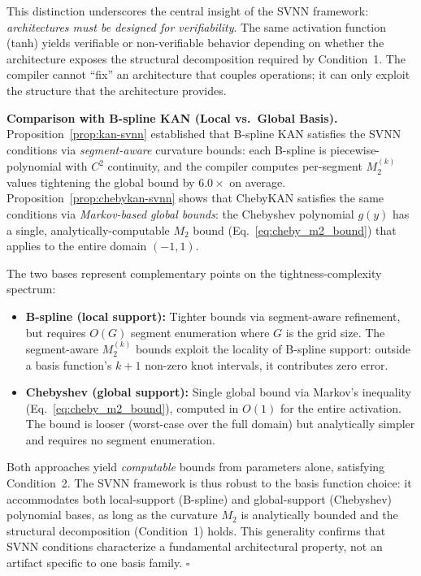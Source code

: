 This distinction underscores the central insight of the SVNN framework:
\textit{architectures must be designed for verifiability}. The same
activation function (tanh) yields verifiable or non-verifiable behavior
depending on whether the architecture exposes the structural decomposition
required by Condition~1. The compiler cannot ``fix'' an architecture that
couples operations; it can only exploit the structure that the architecture
provides.

\vspace{2pt}
\noindent\textbf{Comparison with B-spline KAN (Local vs.\ Global Basis).}
Proposition~\ref{prop:kan-svnn} established that B-spline KAN satisfies the
SVNN conditions via \textit{segment-aware} curvature bounds: each B-spline
is piecewise-polynomial with $C^2$ continuity, and the compiler computes
per-segment $M_2^{(k)}$ values tightening the global bound by $6.0\times$
on average. Proposition~\ref{prop:chebykan-svnn} shows that ChebyKAN
satisfies the same conditions via \textit{Markov-based global bounds}: the
Chebyshev polynomial $g(y)$ has a single, analytically-computable $M_2$
bound (Eq.~\ref{eq:cheby_m2_bound}) that applies to the entire domain
$(-1,1)$.

The two bases represent complementary points on the tightness-complexity
spectrum:
\begin{itemize}
    \item \textbf{B-spline (local support):} Tighter bounds via
          segment-aware refinement, but requires $O(G)$ segment enumeration
          where $G$ is the grid size. The segment-aware $M_2^{(k)}$ bounds
          exploit the locality of B-spline support: outside a basis
          function's $k+1$ non-zero knot intervals, it contributes zero
          error.

    \item \textbf{Chebyshev (global support):} Single global bound via
          Markov's inequality (Eq.~\ref{eq:cheby_m2_bound}), computed in
          $O(1)$ for the entire activation. The bound is looser
          (worst-case over the full domain) but analytically simpler and
          requires no segment enumeration.
\end{itemize}

Both approaches yield \textit{computable} bounds from parameters alone,
satisfying Condition~2. The SVNN framework is thus robust to the basis
function choice: it accommodates both local-support (B-spline) and
global-support (Chebyshev) polynomial bases, as long as the curvature $M_2$
is analytically bounded and the structural decomposition (Condition~1)
holds. This generality confirms that SVNN conditions characterize a
fundamental architectural property, not an artifact specific to one basis
family. $\square$

